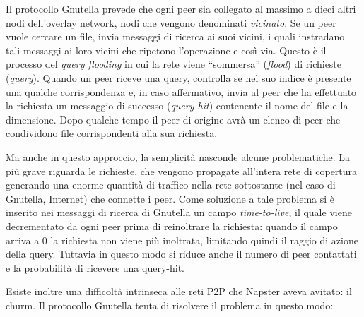 Il protocollo Gnutella prevede che ogni peer sia collegato al massimo a
dieci altri nodi dell'overlay network, nodi che vengono denominati
\emph{vicinato}. Se un peer vuole cercare un file, invia messaggi di
ricerca ai suoi vicini, i quali instradano tali messaggi ai loro vicini
che ripetono l'operazione e così via. Questo è il processo del
\emph{query flooding} in cui la rete viene ``sommersa'' (\emph{flood})
di richieste (\emph{query}). Quando un peer riceve una query, controlla
se nel suo indice è presente una qualche corrispondenza e, in caso
affermativo, invia al peer che ha effettuato la richiesta un messaggio
di successo (\emph{query-hit}) contenente il nome del file e la
dimensione. Dopo qualche tempo il peer di origine avrà un elenco di peer
che condividono file corrispondenti alla sua richiesta.

Ma anche in questo approccio, la semplicità nasconde alcune
problematiche. La più grave riguarda le richieste, che vengono propagate
all'intera rete di copertura generando una enorme quantità di traffico
nella rete sottostante (nel caso di Gnutella, Internet) che connette i
peer. Come soluzione a tale problema si è inserito nei messaggi di
ricerca di Gnutella un campo \emph{time-to-live}, il quale viene
decrementato da ogni peer prima di reinoltrare la richiesta: quando il
campo arriva a 0 la richiesta non viene più inoltrata, limitando quindi
il raggio di azione della query. Tuttavia in questo modo si riduce anche
il numero di peer contattati e la probabilità di ricevere una query-hit.

Esiste inoltre una difficoltà intrinseca alle reti P2P che Napster aveva
avitato: il churm. Il protocollo Gnutella tenta di risolvere il problema
in questo modo:

